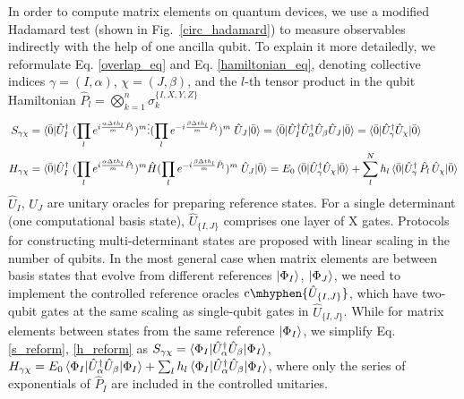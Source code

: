 \documentclass[journal=jctcce,manuscript=article]{achemso}
\newcommand{\controlop}[1]{\mathrm{c}\mhyphen{#1}}
\begin{document}
 In order to compute matrix elements on quantum devices, we use a modified Hadamard test\cite{Somma:2003jz} (shown in Fig.~\ref{circ_hadamard}) to measure observables indirectly with the help of one ancilla qubit. To explain it more detailedly, we reformulate Eq. \ref{overlap_eq} and Eq. \ref{hamiltonian_eq}, denoting collective indices $\gamma = (I, \alpha)$, $\chi = (J, \beta)$, and the $l$-th tensor product in the qubit Hamiltonian $\hat{P}_l =  \bigotimes_{k=1}^n \sigma_{k}^{\{I,X,Y,Z\}}$
\begin{align}
\label{s_reform}
S_{\gamma \chi} 
& = \braket{\bar{0} | \hat{U}_I^\dagger \; (\prod_{l} e^{i \frac{\alpha \Delta t h_{l}}{m} \hat{P}_l  } )^{m}  \vdots    
( \prod_{l} e^{- i \frac{\beta \Delta t h_{l}}{m}  \hat{P}_l  } )^{m}   \;    \hat{U}_J  |  \bar{0}  }  
= \braket{\bar{0} | \hat{U}_I^{\dagger}   \hat{U}_\alpha^{\dagger}   \hat{U}_\beta    \hat{U}_J  |  \bar{0}  }
= \braket{\bar{0} | \hat{U}_\gamma^{\dagger}  \hat{U}_\chi  |  \bar{0}  }  \\
\label{h_reform}
H_{\gamma \chi} 
& = \braket{\bar{0} | \hat{U}_I^\dagger \; (\prod_{l} e^{i \frac{\alpha \Delta t h_{l}}{m} \hat{P}_l  } )^{m}  \hat{H}
( \prod_{l} e^{- i \frac{\beta \Delta t h_{l}}{m}  \hat{P}_l  } )^{m}   \;    \hat{U}_J  |  \bar{0}  } 
= E_0 \braket{\bar{0} | \hat{U}_\gamma^{\dagger}  \hat{U}_\chi  |  \bar{0}  }  +\sum_l^N   h_l  \braket{\bar{0} | \hat{U}_\gamma^{\dagger} \,  \hat{P}_l   \,  \hat{U}_\chi  |  \bar{0}  }
\end{align}
$\hat{U}_I$, $\hat{U}_J$ are unitary oracles for preparing reference states. For a single determinant (one computational basis state), $\hat{U}_{\{I,J\}}$ comprises one layer of X gates. Protocols for constructing multi-determinant states are proposed\cite{Sugisaki:2016kx, Tubman:2018wz} with linear scaling in the number of qubits. 
In the most general case when matrix elements are between basis states that evolve from different references $\left\vert{\Phi_I}\right\rangle$, $\left\vert{\Phi_J}\right\rangle$, we need to implement the controlled reference oracles $\controlop{\hat{U}_{\{I,J\}}}$, which have two-qubit gates at the same scaling as single-qubit gates in $\hat{U}_{\{I,J\}}$.
While for matrix elements between states from the same reference $\left\vert{\Phi_I}\right\rangle$, we simplify Eq. \ref{s_reform}, \ref{h_reform} as $S_{\gamma \chi}=\braket{\Phi_I |  \hat{U}_\alpha^{\dagger}  \hat{U}_\beta  |  \Phi_I  }$,
$H_{\gamma \chi}=E_0 \braket{\Phi_I |  \hat{U}_\alpha^{\dagger}  \hat{U}_\beta  |  \Phi_I  }  + \sum_l h_l \braket{\Phi_I |  \hat{U}_\alpha^{\dagger}  \hat{U}_\beta  |  \Phi_I  }$,
where only the series of exponentials of $\hat{P}_I$ are included in the controlled unitaries.
\end{document}
